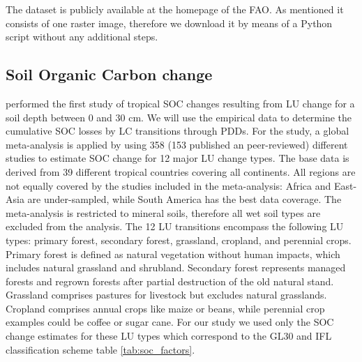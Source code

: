 		The dataset is publicly available at the homepage of the \ac{FAO}. As mentioned it consists of one raster image, therefore we download it by means of a Python script without any additional steps.

	\subsection{Soil Organic Carbon change}
	\label{subsec:methods_socc}
		\citet{Don2010} performed the first study of tropical \ac{SOC} changes resulting from \ac{LU} change for a soil depth between 0 and 30 cm. We will use the empirical data to determine the cumulative \ac{SOC} losses by \ac{LC} transitions through \acp{PDD}. For the study, a global meta-analysis is applied by using 358 (153 published an peer-reviewed) different studies to estimate \ac{SOC} change for 12 major \ac{LU} change types. The base data is derived from 39 different tropical countries covering all continents. All regions are not equally covered by the studies included in the meta-analysis: Africa and East-Asia are under-sampled, while South America has the best data coverage. The meta-analysis is restricted to mineral soils, therefore all wet soil types are excluded from the analysis. The 12 \ac{LU} transitions encompass the following \ac{LU} types: primary forest, secondary forest, grassland, cropland, and perennial crops. Primary forest is defined as natural vegetation without human impacts, which includes natural grassland and shrubland. Secondary forest represents managed forests and regrown forests after partial destruction of the old natural stand. Grassland comprises pastures for livestock but excludes natural grasslands. Cropland comprises annual crops like maize or beans, while perennial crop examples could be coffee or sugar cane. For our study we used only the \ac{SOC} change estimates for these \ac{LU} types which correspond to the \ac{GL30} and \ac{IFL} classification scheme table \ref{tab:soc_factors}.
